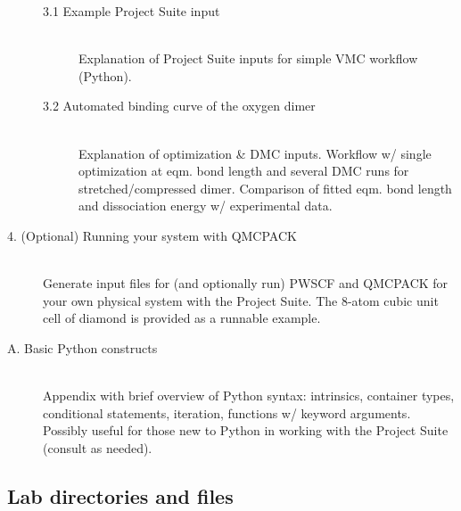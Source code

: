 \begin{description}
  \begin{description}
  \item[3.1 Example Project Suite input] \hfill \\
    Explanation of Project Suite inputs for simple VMC workflow (Python).
  \item[3.2 Automated binding curve of the oxygen dimer] \hfill \\
    Explanation of optimization \& DMC inputs.  Workflow w/ single optimization at eqm. bond length and several DMC runs for stretched/compressed dimer.  Comparison of fitted eqm. bond length and dissociation energy w/ experimental data.
  \end{description}
\item[4. (Optional) Running your system with QMCPACK] \hfill \\
  Generate input files for (and optionally run) PWSCF and QMCPACK for your own physical system with the Project Suite.  The 8-atom cubic unit cell of diamond is provided as a runnable example.
\item[A. Basic Python constructs] \hfill \\
  Appendix with brief overview of Python syntax: intrinsics, container types, conditional statements, iteration, functions w/ keyword arguments.  Possibly useful for those new to Python in working with the Project Suite (consult as needed).
\end{description}

\subsection{Lab directories and files}

